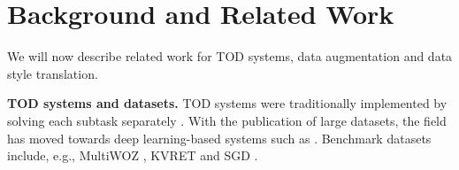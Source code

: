 \section{Background and Related Work}
We will now describe related work for TOD systems, data augmentation and data style translation.

\textbf{TOD systems and datasets.}
TOD systems were traditionally implemented by solving each subtask separately \cite{youngPOMDPBasedStatisticalSpoken2013}.
With the publication of large datasets, the field has moved towards deep learning-based systems such as \citet{lin-etal-2020-mintl, peng-etal-2021-soloist, heGalaxyGenerativePretrained2022}.
Benchmark datasets include, e.g., MultiWOZ \cite{budzianowski-etal-2018-multiwoz},
KVRET \cite{eric-etal-2017-key} and SGD \cite{rastogiScalableMultiDomainConversational2020}.


